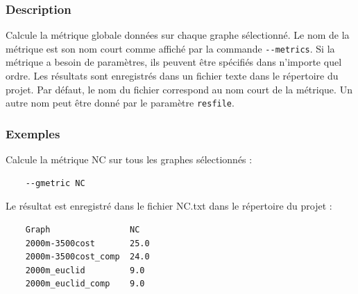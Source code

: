 \documentclass[a4paper,10pt]{report}
\begin{document}
\subsubsection{Description}
Calcule la métrique globale données sur chaque graphe sélectionné.
Le nom de la métrique est son nom court comme affiché par la commande \verb|--metrics|.
Si la métrique a besoin de paramètres, ils peuvent être spécifiés dans n'importe quel ordre.
Les résultats sont enregistrés dans un fichier texte dans le répertoire du projet. Par défaut, le nom du fichier correspond au nom court de la métrique. Un autre nom peut être donné par le paramètre \verb|resfile|.

\subsubsection{Exemples}
Calcule la métrique NC sur tous les graphes sélectionnés :
\begin{Verbatim}
	--gmetric NC
\end{Verbatim}
Le résultat est enregistré dans le fichier NC.txt dans le répertoire du projet :
\begin{Verbatim}
	Graph                NC
	2000m-3500cost       25.0
	2000m-3500cost_comp  24.0
	2000m_euclid         9.0
	2000m_euclid_comp    9.0
\end{Verbatim}
\end{document}
